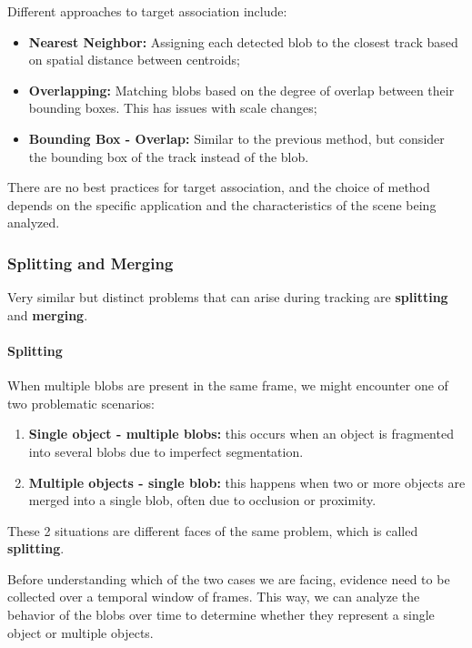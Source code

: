 Different approaches to target association include:
\begin{itemize}
    \item \textbf{Nearest Neighbor:} Assigning each detected blob to the closest track based on spatial distance between centroids;
    \item \textbf{Overlapping:} Matching blobs based on the degree of overlap between their bounding boxes. 
    This has issues with scale changes;
    \item \textbf{Bounding Box - Overlap:} Similar to the previous method, but consider the bounding box of the track instead of the blob.
\end{itemize}
There are no best practices for target association, and the choice of method depends on the specific application and the characteristics of the scene being analyzed.

\subsubsection{Splitting and Merging}
Very similar but distinct problems that can arise during tracking are \textbf{splitting} and \textbf{merging}.

\paragraph{Splitting}
When multiple blobs are present in the same frame, we might encounter one of two problematic scenarios:
\begin{enumerate}
    \item \textbf{Single object - multiple blobs:} this occurs when an object is fragmented into several blobs due to imperfect segmentation.
    \item \textbf{Multiple objects - single blob:} this happens when two or more objects are merged into a single blob, often due to occlusion or proximity.
\end{enumerate}
These 2 situations are different faces of the same problem, which is called \textbf{splitting}. 

Before understanding which of the two cases we are facing, evidence need to be collected over a temporal window of frames.
This way, we can analyze the behavior of the blobs over time to determine whether they represent a single object or multiple objects.

